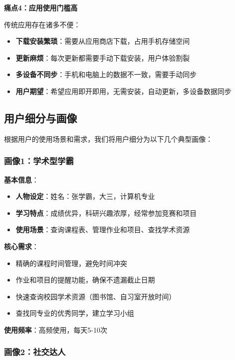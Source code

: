 \documentclass[12pt,a4paper]{article}
\begin{document}
\textbf{痛点4：应用使用门槛高}

传统应用存在诸多不便：

\begin{itemize}
    \item \textbf{下载安装繁琐}：需要从应用商店下载，占用手机存储空间
    \item \textbf{更新麻烦}：每次更新都需要手动下载安装，用户体验割裂
    \item \textbf{多设备不同步}：手机和电脑上的数据不一致，需要手动同步
    \item \textbf{用户期望}：希望应用即开即用，无需安装，自动更新，多设备数据同步
\end{itemize}

\subsection{用户细分与画像}

根据用户的使用场景和需求，我们将用户细分为以下几个典型画像：

\subsubsection{画像1：学术型学霸}

\textbf{基本信息}：
\begin{itemize}
    \item \textbf{人物设定}：姓名：张学霸，大三，计算机专业
    \item \textbf{学习特点}：成绩优异，科研兴趣浓厚，经常参加竞赛和项目
    \item \textbf{使用场景}：查询课程表、管理作业和项目、查找学术资源
\end{itemize}

\textbf{核心需求}：
\begin{itemize}
    \item 精确的课程时间管理，避免时间冲突
    \item 作业和项目的提醒功能，确保不遗漏截止日期
    \item 快速查询校园学术资源（图书馆、自习室开放时间）
    \item 查找同专业的优秀同学，建立学习小组
\end{itemize}

\textbf{使用频率}：高频使用，每天5-10次

\subsubsection{画像2：社交达人}
\end{document}
